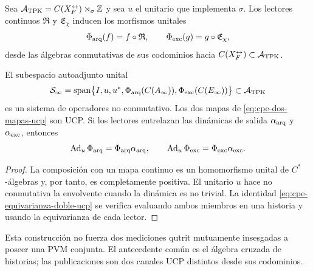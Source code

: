 Sea
\(\mathcal A_{\rm TPK}=C(X_F^{\leftrightarrow})\rtimes_\sigma\mathbb Z\)
y sea \(u\) el unitario que implementa \(\sigma\). Los lectores continuos
\(\mathfrak R\) y \(\mathfrak E_\chi\) inducen los morfismos unitales
\begin{equation}
 \Phi_{\rm arq}(f)=f\circ\mathfrak R,
 \qquad
 \Phi_{\rm exc}(g)=g\circ\mathfrak E_\chi,
 \label{eq:cpe-dos-mapas-ucp}
\end{equation}
desde las álgebras conmutativas de sus codominios hacia
\(C(X_F^{\leftrightarrow})\subset\mathcal A_{\rm TPK}\).

\begin{theorem}
\label{thm:cpe-sistema-operadores-comun}
El subespacio autoadjunto unital
\[
 \mathcal S_\infty
 =\operatorname{span}\bigl\{
 I,u,u^*,\Phi_{\rm arq}(C(A_\infty)),
 \Phi_{\rm exc}(C(E_\infty))\bigr\}
 \subset\mathcal A_{\rm TPK}
\]
es un sistema de operadores no conmutativo. Los dos mapas de
\eqref{eq:cpe-dos-mapas-ucp} son UCP\@. Si los lectores entrelazan las
dinámicas de salida \(\alpha_{\rm arq}\) y \(\alpha_{\rm exc}\), entonces
\begin{equation}
 \operatorname{Ad}_u\Phi_{\rm arq}
 =\Phi_{\rm arq}\alpha_{\rm arq},
 \qquad
 \operatorname{Ad}_u\Phi_{\rm exc}
 =\Phi_{\rm exc}\alpha_{\rm exc}.
 \label{eq:cpe-equivarianza-doble-ucp}
\end{equation}
\end{theorem}

\begin{proof}
La composición con un mapa continuo es un homomorfismo unital de
\(C^*\)-álgebras y, por tanto, es completamente positiva. El unitario
\(u\) hace no conmutativa la envolvente cuando la dinámica es no trivial.
La identidad \eqref{eq:cpe-equivarianza-doble-ucp} se verifica evaluando
ambos miembros en una historia y usando la equivarianza de cada lector.
\end{proof}

Esta construcción no fuerza dos mediciones qutrit mutuamente insesgadas a
poseer una PVM conjunta. El antecedente común es el álgebra cruzada de
historias; las publicaciones son dos canales UCP distintos desde sus
codominios.

